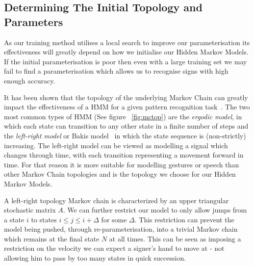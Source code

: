 \subsection{Determining The Initial Topology and Parameters}
As our training method utilises a local search to improve our parameterisation its effectiveness will greatly depend on how we initialise our Hidden Markov Models. If the initial parameterisation is poor then even with a large training set we may fail to find a parameterisation which allows us to recognise signs with high enough accuracy.

It has been shown that the topology of the underlying Markov Chain can greatly impact the effectiveness of a HMM for a given pattern recognition task~\citep{rabiner1989tutorial, jelinek1998statistical}. The two most common types of HMM (See figure ~\ref{fig:mctop}) are the \emph{ergodic model}, in which each state can transition to any other state in a finite number of steps and the \emph{left-right model} or Bakis model~\citep{bakis1976continuous} in which the state sequence is (non-strictly) increasing. The left-right model can be viewed as modelling a signal which changes through time, with each transition representing a movement forward in time. For that reason it is more suitable for modelling gestures or speech than other Markov Chain topologies and is the topology we choose for our Hidden Markov Models.

A left-right topology Markov chain is characterized by an upper triangular stochastic matrix $A$. We can further restrict our model to only allow jumps from a state $i$ to states $i \leq j \leq i+\Delta$ for some $\Delta$. This restriction can prevent the model being pushed, through re-parameterisation, into a trivial Markov chain which remains at the final state $N$ at all times. This can be seen as imposing a restriction on the velocity we can expect a signer's hand to move at - not allowing him to pass by too many states in quick succession.

